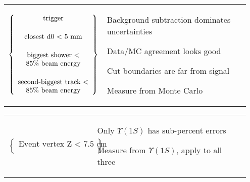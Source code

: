 \documentclass[landscape]{article}
\begin{document}
\begin{tabular}{p{0.35\linewidth} p{0.6\linewidth}}
  \begin{minipage}{\linewidth}
    $\left\{ \begin{array}{c}
      \vspace{0.5 cm} \mbox{trigger} \\
      \vspace{0.5 cm} \mbox{closest d0 $<$ 5 mm} \\
      \mbox{biggest shower $<$} \\
      \vspace{0.5 cm} \mbox{85\% beam energy} \\
      \mbox{second-biggest track $<$} \\
      \mbox{85\% beam energy}
    \end{array} \right\}$
  \end{minipage} &
  \begin{minipage}{\linewidth}
    Background subtraction dominates uncertainties

    \vspace{1 cm}
    Data/MC agreement looks good

    \vspace{1 cm}
    Cut boundaries are far from signal

    \vspace{1 cm}
    Measure from Monte Carlo
  \end{minipage}
\end{tabular}

\vfill

\begin{tabular}{p{0.35\linewidth} p{0.6\linewidth}}
  \begin{minipage}{\linewidth}
    $\left\{ \begin{array}{c}
      \mbox{Event vertex Z $<$ 7.5 cm} \\
    \end{array} \right\}$
  \end{minipage} &
  \begin{minipage}{\linewidth}
    Only $\Upsilon(1S)$ has sub-percent errors

    Measure from $\Upsilon(1S)$, apply to all three
  \end{minipage}
\end{tabular}

\vfill
\end{document}
